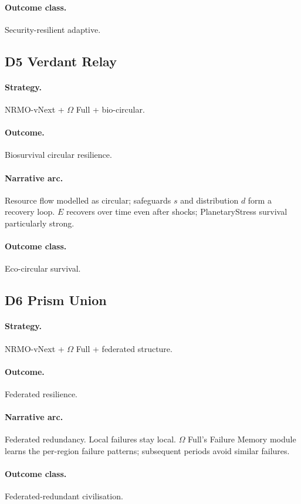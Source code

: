 \paragraph{Outcome class.} Security-resilient adaptive.

\subsection{D5 Verdant Relay}
\label{civ:d5}

\paragraph{Strategy.} NRMO-vNext + $\Omega$ Full + bio-circular.
\paragraph{Outcome.} Biosurvival circular resilience.
\paragraph{Narrative arc.}
Resource flow modelled as circular; safeguards $s$ and
distribution $d$ form a recovery loop. $E$ recovers over time
even after shocks; PlanetaryStress survival particularly strong.
\paragraph{Outcome class.} Eco-circular survival.

\subsection{D6 Prism Union}
\label{civ:d6}

\paragraph{Strategy.} NRMO-vNext + $\Omega$ Full + federated
structure.
\paragraph{Outcome.} Federated resilience.
\paragraph{Narrative arc.}
Federated redundancy. Local failures stay local. $\Omega$
Full's Failure Memory module learns the per-region failure
patterns; subsequent periods avoid similar failures.
\paragraph{Outcome class.} Federated-redundant civilisation.

